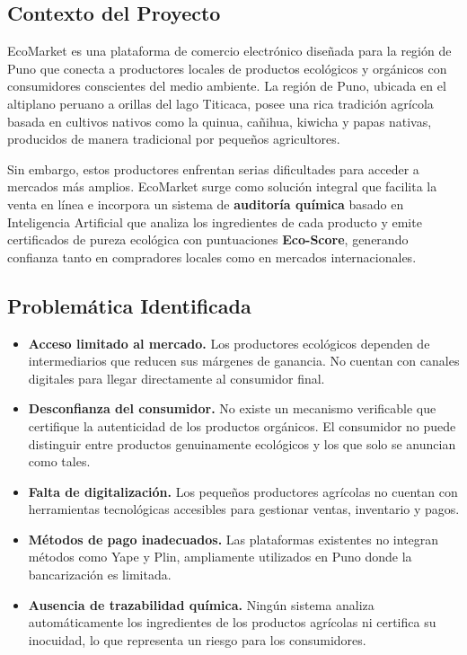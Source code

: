 \documentclass[12pt,a4paper]{article}
\begin{document}
\subsection{Contexto del Proyecto}

EcoMarket es una plataforma de comercio electr\'onico dise\~nada para la regi\'on de
Puno que conecta a productores locales de productos ecol\'ogicos y org\'anicos con
consumidores conscientes del medio ambiente. La regi\'on de Puno, ubicada en el
altiplano peruano a orillas del lago Titicaca, posee una rica tradici\'on agr\'icola basada
en cultivos nativos como la quinua, ca\~nihua, kiwicha y papas nativas, producidos de
manera tradicional por peque\~nos agricultores.

Sin embargo, estos productores enfrentan serias dificultades para acceder a mercados
m\'as amplios. EcoMarket surge como soluci\'on integral que facilita la venta en l\'inea e
incorpora un sistema de \textbf{auditor\'ia qu\'imica} basado en Inteligencia Artificial que
analiza los ingredientes de cada producto y emite certificados de pureza ecol\'ogica
con puntuaciones \textbf{Eco-Score}, generando confianza tanto en compradores locales
como en mercados internacionales.

\subsection{Problem\'atica Identificada}

\begin{itemize}[leftmargin=1.5cm]
  \item \textbf{Acceso limitado al mercado.} Los productores ecol\'ogicos dependen de
    intermediarios que reducen sus m\'argenes de ganancia. No cuentan con canales
    digitales para llegar directamente al consumidor final.

  \item \textbf{Desconfianza del consumidor.} No existe un mecanismo verificable que
    certifique la autenticidad de los productos org\'anicos. El consumidor no puede
    distinguir entre productos genuinamente ecol\'ogicos y los que solo se anuncian
    como tales.

  \item \textbf{Falta de digitalizaci\'on.} Los peque\~nos productores agr\'icolas no cuentan
    con herramientas tecnol\'ogicas accesibles para gestionar ventas, inventario y
    pagos.

  \item \textbf{M\'etodos de pago inadecuados.} Las plataformas existentes no integran
    m\'etodos como Yape y Plin, ampliamente utilizados en Puno donde la
    bancarizaci\'on es limitada.

  \item \textbf{Ausencia de trazabilidad qu\'imica.} Ning\'un sistema analiza autom\'aticamente
    los ingredientes de los productos agr\'icolas ni certifica su inocuidad, lo que
    representa un riesgo para los consumidores.
\end{itemize}
\end{document}
